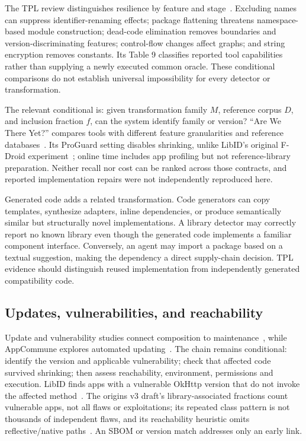The TPL review distinguishes resilience by feature and stage~\cite{tpl}. Excluding names can suppress identifier-renaming effects; package flattening threatens namespace-based module construction; dead-code elimination removes boundaries and version-discriminating features; control-flow changes affect graphs; and string encryption removes constants. Its Table 9 classifies reported tool capabilities rather than supplying a newly executed common oracle. These conditional comparisons do not establish universal impossibility for every detector or transformation.

The relevant conditional is: given transformation family $M$, reference corpus $D$, and inclusion fraction $f$, can the system identify family or version? ``Are We There Yet?'' compares tools with different feature granularities and reference databases~\cite{tplready}. Its ProGuard setting disables shrinking, unlike LibID's original F-Droid experiment~\cite{libid}; online time includes app profiling but not reference-library preparation. Neither recall nor cost can be ranked across those contracts, and reported implementation repairs were not independently reproduced here.

Generated code adds a related transformation. Code generators can copy templates, synthesize adapters, inline dependencies, or produce semantically similar but structurally novel implementations. A library detector may correctly report no known library even though the generated code implements a familiar component interface. Conversely, an agent may import a package based on a textual suggestion, making the dependency a direct supply-chain decision. TPL evidence should distinguish reused implementation from independently generated compatibility code.

\subsection{Updates, vulnerabilities, and reachability}

Update and vulnerability studies connect composition to maintenance~\cite{keepupdated,developersupdate,originsvuln}, while AppCommune explores automated updating~\cite{appcommune}. The chain remains conditional: identify the version and applicable vulnerability; check that affected code survived shrinking; then assess reachability, environment, permissions and execution. LibID finds apps with a vulnerable OkHttp version that do not invoke the affected method~\cite{libid}. The origins v3 draft's library-associated fractions count vulnerable apps, not all flaws or exploitations; its repeated class pattern is not thousands of independent flaws, and its reachability heuristic omits reflective/native paths~\cite{originsvuln}. An SBOM or version match addresses only an early link.

